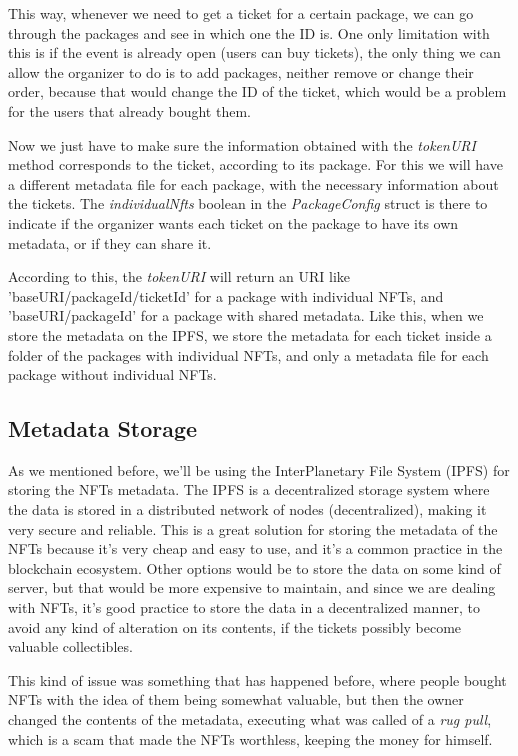 This way, whenever we need to get a ticket for a certain package, we can go through the packages and see in which one the ID is. One only limitation with this is if the event is already open (users can buy tickets), the only thing we can allow the organizer to do is to add packages, neither remove or change their order, because that would change the ID of the ticket, which would be a problem for the users that already bought them.

Now we just have to make sure the information obtained with the \textit{tokenURI} method corresponds to the ticket, according to its package. For this we will have a different metadata file for each package, with the necessary information about the tickets. The \textit{individualNfts} boolean in the \textit{PackageConfig} struct is there to indicate if the organizer wants each ticket on the package to have its own metadata, or if they can share it.

According to this, the \textit{tokenURI} will return an URI like 'baseURI/packageId/ticketId' for a package with individual NFTs, and 'baseURI/packageId' for a package with shared metadata. Like this, when we store the metadata on the IPFS, we store the metadata for each ticket inside a folder of the packages with individual NFTs, and only a metadata file for each package without individual NFTs.

\subsection{Metadata Storage}
\label{subsec:metadata_storage}

As we mentioned before, we'll be using the InterPlanetary File System (IPFS) for storing the NFTs metadata. The IPFS is a decentralized storage system where the data is stored in a distributed network of nodes (decentralized), making it very secure and reliable. This is a great solution for storing the metadata of the NFTs because it's very cheap and easy to use, and it's a common practice in the blockchain ecosystem. Other options would be to store the data on some kind of server, but that would be more expensive to maintain, and since we are dealing with NFTs, it's good practice to store the data in a decentralized manner, to avoid any kind of alteration on its contents, if the tickets possibly become valuable collectibles.

This kind of issue was something that has happened before, where people bought NFTs with the idea of them being somewhat valuable, but then the owner changed the contents of the metadata, executing what was called of a \textit{rug pull}, which is a scam that made the NFTs worthless, keeping the money for himself.

